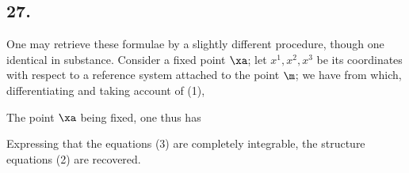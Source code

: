 \subsection*{27.}


One may retrieve these formulae by a slightly different procedure, though one identical in substance. Consider a fixed point $\xa$; let $x^1, x^2, x^3$ be its coordinates with respect to a reference system attached to the point $\m$; we have
from which, differentiating and taking account of (1),

The point $\xa$ being fixed, one thus has

Expressing that the equations (3) are completely integrable, the structure equations (2) are recovered.

%
